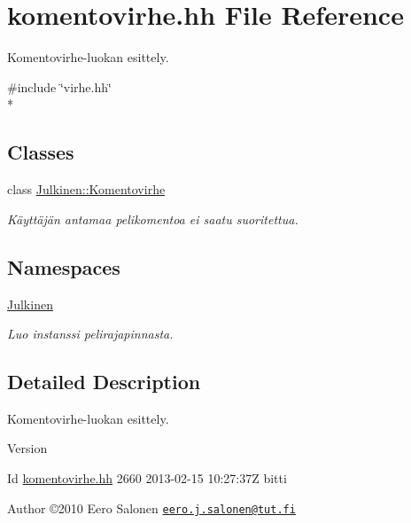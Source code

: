 \hypertarget{komentovirhe_8hh}{}\section{komentovirhe.\+hh File Reference}
\label{komentovirhe_8hh}


Komentovirhe-\/luokan esittely.  


{\ttfamily \#include \char`\"{}virhe.\+hh\char`\"{}}\\*
\subsection*{Classes}
\begin{DoxyCompactItemize}
\item 
class \hyperlink{class_julkinen_1_1_komentovirhe}{Julkinen\+::\+Komentovirhe}
\begin{DoxyCompactList}\small\item\em Käyttäjän antamaa pelikomentoa ei saatu suoritettua. \end{DoxyCompactList}\end{DoxyCompactItemize}
\subsection*{Namespaces}
\begin{DoxyCompactItemize}
\item 
 \hyperlink{namespace_julkinen}{Julkinen}
\begin{DoxyCompactList}\small\item\em Luo instanssi pelirajapinnasta. \end{DoxyCompactList}\end{DoxyCompactItemize}


\subsection{Detailed Description}
Komentovirhe-\/luokan esittely. 

\begin{DoxyVersion}{Version}

\end{DoxyVersion}
\begin{DoxyParagraph}{Id}
\hyperlink{komentovirhe_8hh}{komentovirhe.\+hh} 2660 2013-\/02-\/15 10\+:27\+:37\+Z bitti 
\end{DoxyParagraph}


\begin{DoxyAuthor}{Author}
©2010 Eero Salonen \href{mailto:eero.j.salonen@tut.fi}{\tt eero.\+j.\+salonen@tut.\+fi} 
\end{DoxyAuthor}
